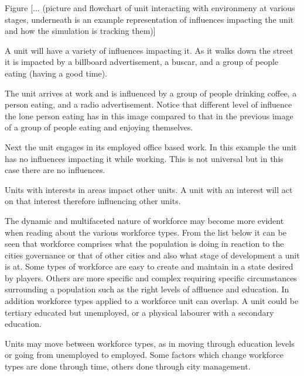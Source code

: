 Figure [... (picture and flowchart of unit interacting with environmeny at various stages, underneath is an example representation of influences impacting the unit and how the simulation is tracking them)]

A unit will have a variety of influences impacting it. As it walks down the street it is impacted by a billboard advertisement, a buscar, and a group of people eating (having a good time).

The unit arrives at work and is influenced by a group of people drinking coffee, a person eating, and a radio advertisement. Notice that different level of influence the lone person eating has in this image compared to that in the previous image of a group of people eating and enjoying themselves.

Next the unit engages in its employed office based work. In this example the unit has no influences impacting it while working. This is not universal but in this case there are no influences.



Units with interests in areas impact other units.
A unit with an interest will act on that interest therefore influencing other units.



The dynamic and multifaceted nature of workforce may become more evident when reading about the various workforce types. From the list below it can be seen that workforce comprises what the population is doing in reaction to the cities governance or that of other cities and also what stage of development a unit is at. Some types of workforce are easy to create and maintain in a state desired by players. Others are more specific and complex requiring specific circumstances surrounding a population such as the right levels of affluence and education. In addition workforce types applied to a workforce unit can overlap. A unit could be tertiary educated but unemployed, or a physical labourer with a secondary education. 

Units may move between workforce types, as in moving through education levels or going from unemployed to employed. Some factors which change workforce types are done through time, others done through city management.


